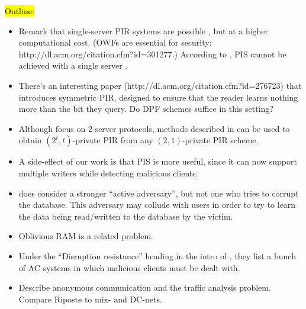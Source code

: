 %
\label{sec-related}

\hl{Outline:}
\begin{itemize}

  \item Remark that single-server PIR systems are possible
    \cite{pir-single-server}, but at a higher computational cost. (OWFs are
    essential for security: http://dl.acm.org/citation.cfm?id=301277.) According
    to \cite{dpf}, PIS cannot be achieved with a single server \cite{dpf}.

  \item There's an interesting paper (http://dl.acm.org/citation.cfm?id=276723)
    that introduces symmetric PIR, designed to ensure that the reader learns
    nothing more than the bit they query. Do DPF schemes suffice in this
    setting?

  \item Although \cite{dpf} focus on 2-server protocols, methods described in
    \cite{dpf-multi-server} can be used to obtain $(2^t, t)$-private PIR from
    any $(2,1)$-private PIR scheme.

  \item A side-effect of our work is that PIS is more useful, since it can now
    support multiple writers while detecting malicious clients.

  \item \cite{pis} does consider a stronger ``active adversary'', but not one
    who tries to corrupt the database. This adversary may collude with users in
    order to try to learn the data being read/written to the database by the
    victim.

  \item Oblivious RAM is a related problem.

  \item Under the ``Disruption resistance'' heading in the intro of
    \cite{riposte}, they list a bunch of AC systems in which malicious clients
    must be dealt with.

  \item Describe anonymous communication and the traffic analysis problem.
    Compare Riposte to mix- and DC-nets.
\end{itemize}

\iffalse %
\heading{Information leakage.} Information is said to be identifiable if it can
be used to link a client to their message. There are two things to remember
about personally identifiable information: one, any identity information
conveyed by the client's message is necessarily leaked in the output of the
system; and two, any information is potentially identifiable given auxiliary
information about the clients. For example, the number of messages sent by the
client might identify which messages they sent. Anonymous communication systems
can only address the problem of linking sensitive data to the identity of the
client.
\fi
